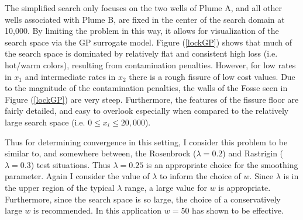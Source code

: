 \documentclass[12pt]{article}
\begin{document}
	The simplified search only focuses on the two wells of Plume A, and all other wells associated with Plume B, are fixed in the center of the search domain at 10,000. 
	By limiting the problem in this way, it allows for visualization of the search space via the GP surrogate model.
	Figure (\ref{lockGP}) shows that much of the search space is dominated by relatively flat and consistent high loss (i.e. hot/warm colors), resulting from contamination penalties.
	However, for low rates in $x_1$ and intermediate rates in $x_2$ there is a rough fissure of low cost values.
	Due to the magnitude of the contamination penalties, the walls of the Fosse seen in Figure (\ref{lockGP}) are very steep.
	Furthermore, the features of the fissure floor are fairly detailed, and easy to overlook especially when compared to the relatively large search space (i.e. \mbox{$0\le x_i\le20,000$}).
	
	\clearpage
	
	Thus for determining convergence in this setting, I consider this problem to be similar to, and somewhere between, the Rosenbrock ($\lambda=0.2$) and Rastrigin ($\lambda=0.3$) test situations.
	Thus $\lambda=0.25$ is an appropriate choice for the smoothing parameter.
	Again I consider the value of $\lambda$ to inform the choice of $w$.
	Since $\lambda$ is in the upper region of the typical $\lambda$ range, a large value for $w$ is appropriate.
	Furthermore, since the search space is so large, the choice of a conservatively large $w$ is recommended.
	In this application $w=50$ has shown to be effective. 
	
\end{document}
